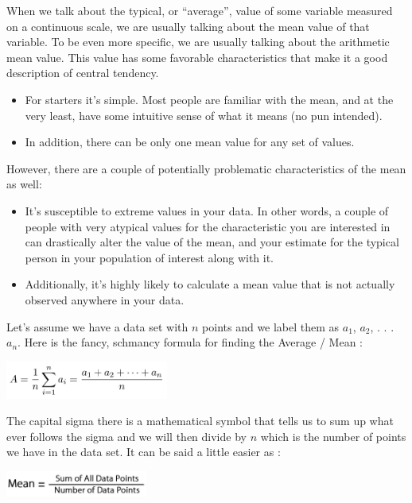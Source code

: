 \documentclass[
  letterpaper,
  DIV=11,
  numbers=noendperiod]{scrreprt}
\begin{document}
When we talk about the typical, or ``average'', value of some variable
measured on a continuous scale, we are usually talking about the mean
value of that variable. To be even more specific, we are usually talking
about the arithmetic mean value. This value has some favorable
characteristics that make it a good description of central tendency.

\begin{itemize}
\item
  For starters it's simple. Most people are familiar with the mean, and
  at the very least, have some intuitive sense of what it means (no pun
  intended).
\item
  In addition, there can be only one mean value for any set of values.
\end{itemize}

However, there are a couple of potentially problematic characteristics
of the mean as well:

\begin{itemize}
\item
  It's susceptible to extreme values in your data. In other words, a
  couple of people with very atypical values for the characteristic you
  are interested in can drastically alter the value of the mean, and
  your estimate for the typical person in your population of interest
  along with it.
\item
  Additionally, it's highly likely to calculate a mean value that is not
  actually observed anywhere in your data.
\end{itemize}

Let's assume we have a data set with \(n\) points and we label them as
\(a_1\), \(a_2\), . . . \(a_n\). Here is the fancy, schmancy formula for
finding the Average / Mean :

\includegraphics[width=0.4\textwidth,height=\textheight]{./images/Daily-4-Pic-8.jpg}

The capital sigma there is a mathematical symbol that tells us to sum up
what ever follows the sigma and we will then divide by \(n\) which is
the number of points we have in the data set. It can be said a little
easier as :

\includegraphics[width=0.35\textwidth,height=\textheight]{./images/Daily-4-Pic-9.jpg}
\end{document}
